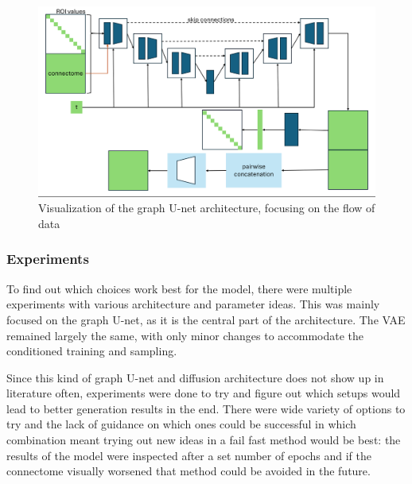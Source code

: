 	\begin{figure}[!h]
		\centering
		\includegraphics[width=\textwidth]{figures/own_gunet.png}
		\caption{Visualization of the graph U-net architecture, focusing on the flow of data}
	\end{figure}
	
	
	\subsubsection{Experiments}
	
	To find out which choices work best for the model, there were multiple experiments with various architecture and parameter ideas. This was mainly focused on the graph U-net, as it is the central part of the architecture. The VAE remained largely the same, with only minor changes to accommodate the conditioned training and sampling.

	Since this kind of graph U-net and diffusion architecture does not show up in literature often, experiments were done to try and figure out which setups would lead to better generation results in the end. There were wide variety of options to try and the lack of guidance on which ones could be successful in which combination meant trying out new ideas in a fail fast method would be best: the results of the model were inspected after a set number of epochs and if the connectome visually worsened that method could be avoided in the future.
	
